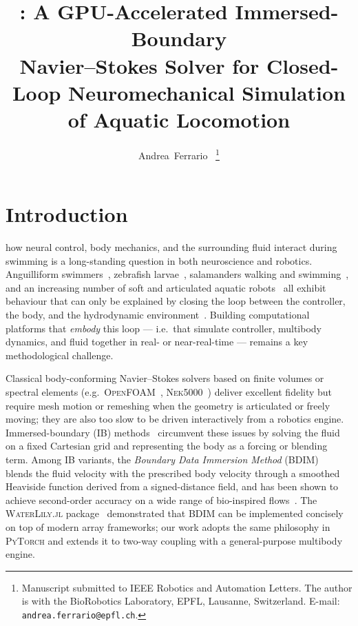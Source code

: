\documentclass[journal,twoside,10pt]{IEEEtran}
\title{\lilytorch: A GPU-Accelerated Immersed-Boundary \\
       Navier--Stokes Solver for Closed-Loop
       Neuromechanical Simulation of Aquatic Locomotion}
\author{Andrea~Ferrario~\IEEEmembership{}%
        \thanks{Manuscript submitted to IEEE Robotics and Automation
        Letters.  The author is with the BioRobotics Laboratory,
        EPFL, Lausanne, Switzerland.
        E-mail: \texttt{andrea.ferrario@epfl.ch}.}%
}
\newcommand{\pytorch}{\textsc{PyTorch}\xspace}
\newcommand{\waterlily}{\textsc{WaterLily.jl}\xspace}
\begin{document}
\maketitle
\IEEEdisplaynontitleabstractindextext
\IEEEpeerreviewmaketitle


\section{Introduction}
 how neural control, body mechanics, and
the surrounding fluid interact during swimming is a long-standing
question in both neuroscience and robotics.  Anguilliform
swimmers~\cite{tytell2004hydrodynamics}, zebrafish
larvae~\cite{muller2008larval,kern2006simulations}, salamanders
walking and swimming~\cite{ijspeert2007salamander}, and an increasing
number of soft and articulated aquatic
robots~\cite{porez2014improved,katzschmann2018exploration} all exhibit
behaviour that can only be explained by closing the loop between the
controller, the body, and the hydrodynamic
environment~\cite{tytell2010interplay}.  Building computational
platforms that \emph{embody} this loop --- i.e.\ that simulate
controller, multibody dynamics, and fluid together in real- or
near-real-time --- remains a key methodological challenge.

Classical body-conforming Navier--Stokes solvers based on finite volumes
or spectral elements
(e.g.\ \textsc{OpenFOAM}~\cite{weller1998openfoam},
\textsc{Nek5000}~\cite{fischer2007nek5000}) deliver excellent fidelity
but require mesh motion or remeshing when the geometry is articulated
or freely moving; they are also too slow to be driven interactively
from a robotics engine.  Immersed-boundary (IB)
methods~\cite{peskin2002immersed,mittal2005immersed} circumvent these
issues by solving the fluid on a fixed Cartesian grid and representing
the body as a forcing or blending term.  Among IB variants, the
\emph{Boundary Data Immersion Method}
(BDIM)~\cite{weymouth2011boundary,maertens2015accurate} blends the
fluid velocity with the prescribed body velocity through a smoothed
Heaviside function derived from a signed-distance field, and has been
shown to achieve second-order accuracy on a wide range of
bio-inspired flows~\cite{lauder2015fish,bhalla2013unified}.  The
\waterlily package~\cite{weymouth2024waterlily} demonstrated that BDIM
can be implemented concisely on top of modern array frameworks; our
work adopts the same philosophy in \pytorch and extends it to two-way
coupling with a general-purpose multibody engine.
\end{document}
